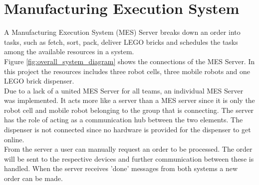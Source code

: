 \chapter{Manufacturing Execution System}\label{chap:mes_server_chapter}

A Manufacturing Execution System (MES) Server breaks down an order into tasks, such as fetch, sort, pack, deliver LEGO bricks and schedules the tasks among the available resources in a system. \\

Figure \ref{fig:overall_system_diagram} shows the connections of the MES Server. In this project the resources includes three robot cells, three mobile robots and one LEGO brick dispenser. \\

Due to a lack of a united MES Server for all teams, an individual MES Server was implemented. It acts more like a server than a MES server since it is only the robot cell and mobile robot belonging to the group that is connecting. The server has the role of acting as a communication hub between the two elements. The dispenser is not connected since no hardware is provided for the dispenser to get online. \\

From the server a user can manually request an order to be processed. The order will be sent to the respective devices and further communication between these is handled. When the server receives 'done' messages from both systems a new order can be made.



%




